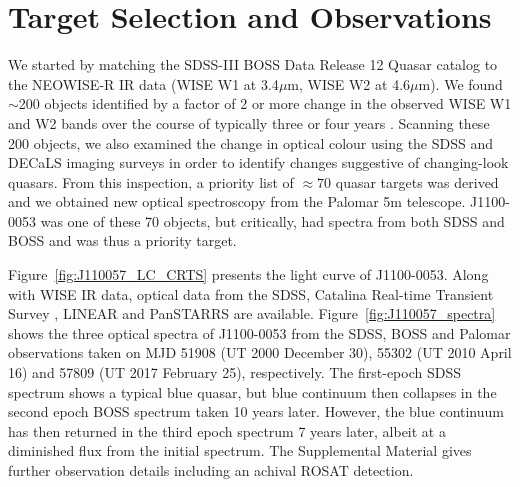 \documentclass{nature}
\begin{document}
\section{Target Selection and Observations}  
We started by matching the SDSS-III BOSS Data Release 12 Quasar
catalog \cite[DR12Q; ][]{Paris2017} to the NEOWISE-R IR data (WISE W1
at 3.4$\mu$m, WISE W2 at 4.6$\mu$m). We found $\sim$200 objects
identified by a factor of 2 or more change in the observed WISE W1 and
W2 bands over the course of typically three or four years
\citep[see][and the Supplemental Material for the detailed NEOWISE-R
selection]{Meisner2017b}. Scanning these 200 objects, we also examined
the change in optical colour using the SDSS and DECaLS imaging surveys
in order to identify changes suggestive of changing-look quasars.
From this inspection, a priority list of $\approx70$ quasar targets
was derived and we obtained new optical spectroscopy from the Palomar
5m telescope.  J1100-0053 was one of these 70 objects, but critically,
had spectra from both SDSS and BOSS and was thus a priority target.

Figure~\ref{fig:J110057_LC_CRTS} presents the light curve of
J1100-0053.  Along with WISE IR data, optical data from the SDSS,
Catalina Real-time Transient Survey \citep[CRTS;][]{Drake2009,
Mahabal2011}, LINEAR \citep{Sesar2011} and PanSTARRS
\citep{Kaiser2010, Stubbs2010, Tonry2012, Magnier2013} are available.
Figure~\ref{fig:J110057_spectra} shows the three optical spectra of
J1100-0053 from the SDSS, BOSS and Palomar observations taken on MJD
51908 (UT 2000 December 30), 55302 (UT 2010 April 16) and 57809 (UT
2017 February 25), respectively.  The first-epoch SDSS spectrum shows
a typical blue quasar, but blue continuum then collapses in the second
epoch BOSS spectrum taken 10 years later. However, the blue continuum
has then returned in the third epoch spectrum 7 years later, albeit at
a diminished flux from the initial spectrum.  The Supplemental
Material gives further observation details including an achival ROSAT
detection.
\end{document}

